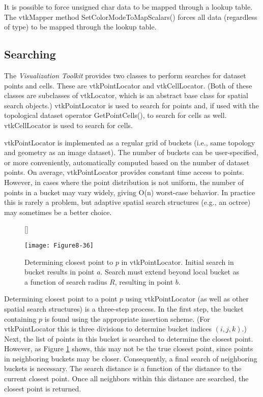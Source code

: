 It is possible to force unsigned char data to be mapped through a lookup table. The vtkMapper method SetColorModeToMapScalars() forces all data  (regardless of type) to be mapped through the lookup table.

\subsection{Searching}

The \emph{Visualization Toolkit} provides two classes to perform searches for dataset points and cells. These are vtkPointLocator and vtkCellLocator. (Both of these classes are subclasses of vtkLocator, which is an abstract base class for spatial search objects.) vtkPointLocator is used to search for points and, if used with the topological dataset operator GetPointCells(), to search for cells as well. vtkCellLocator is used to search for cells.

vtkPointLocator is implemented as a regular grid of buckets (i.e., same topology and geometry as an image dataset). The number of buckets can be user-specified, or more conveniently, automatically computed based on the number of dataset points. On average, vtkPointLocator provides constant time access to points. However, in cases where the point distribution is not uniform, the number of points in a bucket may vary widely, giving O(n) worst-case behavior. In practice this is rarely a problem, but adaptive spatial search structures (e.g., an octree) may sometimes be a better choice.


\begin{figure}[!htb]
	[\FBwidth]
	{\caption{Determining closest point to $p$ in vtkPointLocator. Initial search in bucket results in point $a$. Search must extend beyond local bucket as a function of search radius $R$, resulting in point $b$.}\label{fig:Figure8-36}}
	{\texttt{[image: Figure8-36]}}
\end{figure}

Determining closest point to a point $p$ using vtkPointLocator (as well as other spatial search structures) is a three-step process. In the first step, the bucket containing $p$ is found using the appropriate insertion scheme. (For vtkPointLocator this is three divisions to determine bucket indices $(i, j, k)$.) Next, the list of points in this bucket is searched to determine the closest point. However, as Figure \ref{fig:Figure8-36} shows, this may not be the true closest point, since points in neighboring buckets may be closer. Consequently, a final search of neighboring buckets is necessary. The search distance is a function of the distance to the current closest point. Once all neighbors within this distance are searched, the closest point is returned.

